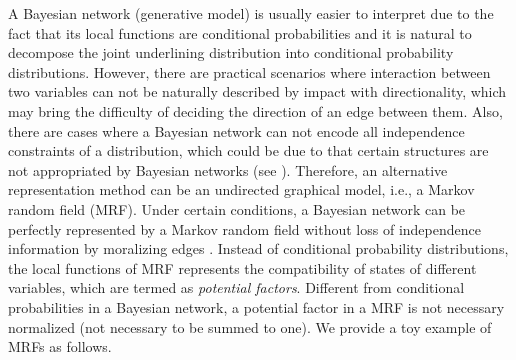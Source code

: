 A Bayesian network (generative model) is usually easier to interpret due to the fact that its local functions are conditional probabilities and it is natural to decompose the joint underlining distribution into conditional probability distributions. However, there are practical scenarios where interaction between two variables can not be naturally described by impact with directionality, which may bring the difficulty of deciding the direction of an edge between them. Also, there are cases where a Bayesian network can not encode all independence constraints of a distribution, which could be due to that certain structures are not appropriated by Bayesian networks (see \cite[seciton~3.4.2]{koller2009pgm}). Therefore, an alternative representation method can be an undirected graphical model, i.e., a Markov random field (MRF). Under certain conditions, a Bayesian network can be perfectly represented by a Markov random field without loss of independence information by moralizing edges \cite[section~4.5]{koller2009pgm}\cite[section~8.3.4]{Bishop:2006:PRM:1162264}. Instead of conditional probability distributions, the local functions of MRF represents the compatibility of states of different variables, which are termed as \textit{potential factors}. Different from conditional probabilities in a Bayesian network, a potential factor in a MRF is not necessary normalized (not necessary to be summed to one). We provide a toy example of MRFs as follows.
